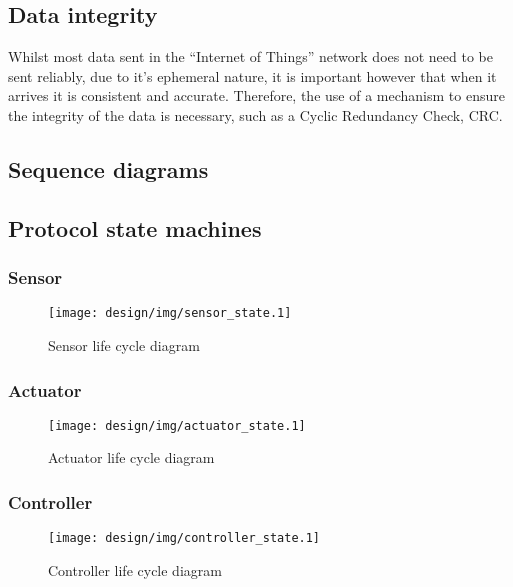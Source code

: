 \subsection{Data integrity}
Whilst most data sent in the ``Internet of Things'' network does not need to be sent reliably, due to it's ephemeral nature, it is important however that when it arrives it is consistent and accurate. Therefore, the use of a mechanism to ensure the integrity of the data is necessary, such as a Cyclic Redundancy Check, CRC.  


\subsection{Sequence diagrams} %
\label{sub:message_passing}

\subsection{Protocol state machines} %
\label{sub:states}

\subsubsection{Sensor} %
\label{ssub:sensor}
\begin{figure}[h!]
\centering
\texttt{[image: design/img/sensor\_state.1]}
\caption{Sensor life cycle diagram}
\label{fig:sensorstate}
\end{figure}
\subsubsection{Actuator} %
\label{ssub:actuator}
\begin{figure}[h!]
\centering
\texttt{[image: design/img/actuator\_state.1]}
\caption{Actuator life cycle diagram}
\label{fig:controllerstate}
\end{figure}

\subsubsection{Controller} %
\label{ssub:controller}
\begin{figure}[h!]
\centering
\texttt{[image: design/img/controller\_state.1]}
\caption{Controller life cycle diagram}
\label{fig:controllerstate}
\end{figure}



